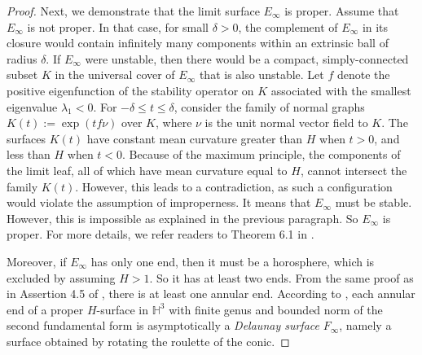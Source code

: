 \documentclass[12pt,a4paper]{amsart}
\numberwithin{equation}{section}
\theoremstyle{plain}
\theoremstyle{named}
\theoremstyle{definition}
\begin{document}
\begin{proof}
 

Next, we demonstrate that the limit surface $E_\infty$ is proper. Assume that $E_\infty$ is not proper. In that case, for small $\delta>0$, the complement of $E_\infty$ in its closure would contain infinitely many components within an extrinsic ball of radius $\delta$. If $E_\infty$ were unstable, then there would be a compact, simply-connected subset $K$ in the universal cover of $E_\infty$ that is also unstable. Let $f$ denote the positive eigenfunction of the stability operator on $K$ associated with the smallest eigenvalue $\lambda_1<0$. For $-\delta\leq t\leq \delta$, consider the family of normal graphs $K(t):=\exp(tf\nu)$ over $K$, where $\nu$ is the unit normal vector field to $K$. The surfaces $K(t)$ have constant mean curvature greater than $H$ when $t>0$, and less than $H$ when $t<0$. Because of the maximum principle, the components of the limit leaf, all of which have mean curvature equal to $H$, cannot intersect the family $K(t)$. However, this leads to a contradiction, as such a configuration would violate the assumption of improperness. It means that $E_\infty$ must be stable. However, this is impossible as explained in the previous paragraph. So $E_\infty$ is proper. For more details, we refer readers to Theorem 6.1 in \cite{Meeks-Rosenberg_properness}.



Moreover, if $E_\infty$ has only one end, then it must be a horosphere, which is excluded by assuming $H>1$. So it has at least two ends. From the same proof as in Assertion 4.5 of \cite{Meeks-Tinaglia_Delaunay}, there is at least one annular end. According to \cite{Korevaar-Kusner-Meeks-Solomon}, each annular end of a proper $H$-surface in $\mathbb{H}^3$ with finite genus and bounded norm of the second fundamental form is asymptotically a \emph{Delaunay surface} $F_\infty$, namely a surface obtained by rotating the roulette of the conic. 


\end{proof}
\end{document}
